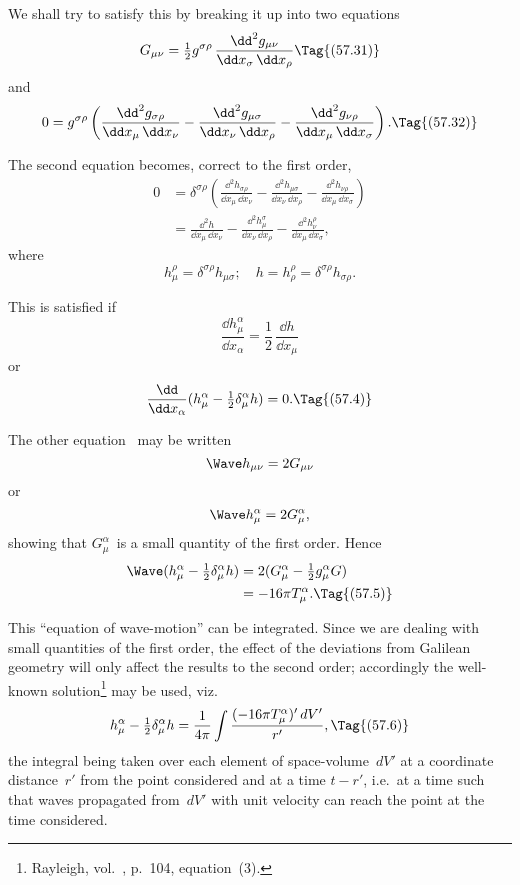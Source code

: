 \documentclass[12pt]{book}
\begin{document}
We shall try to satisfy this by breaking it up into two equations
\[
G_{\mu\nu}
= \tfrac{1}{2}g^{\sigma\rho}\, \frac{\dd^{2} g_{\mu\nu}}{\dd x_{\sigma}\, \dd x_{\rho}}
\Tag{(57.31)}
\]
and
\[
0 = g^{\sigma\rho} \left(\frac{\dd^{2} g_{\sigma\rho}}{\dd x_{\mu}\, \dd x_{\nu}}
  - \frac{\dd^{2} g_{\mu\sigma}}{\dd x_{\nu}\, \dd x_{\rho}}
  - \frac{\dd^{2} g_{\nu\rho}}{\dd x_{\mu}\, \dd x_{\sigma}}\right).
\Tag{(57.32)}
\]

The second equation becomes, correct to the first order,
\begin{align*}
  0 &= \delta^{\sigma\rho} \left(
    \frac{\dd^{2} h_{\sigma\rho}}{\dd x_{\mu}\, \dd x_{\nu}}
  - \frac{\dd^{2} h_{\mu\sigma}}{\dd x_{\nu}\, \dd x_{\rho}}
  - \frac{\dd^{2} h_{\nu\rho}}{\dd x_{\mu}\, \dd x_{\sigma}}\right) \\
  &= \frac{\dd^{2} h}{\dd x_{\mu}\, \dd x_{\nu}}
  - \frac{\dd^{2} h_{\mu}^{\sigma}}{\dd x_{\nu}\, \dd x_{\rho}}
  - \frac{\dd^{2} h_{\nu}^{\rho}}{\dd x_{\mu}\, \dd x_{\sigma}},
\end{align*}
where
\[
h_{\mu}^{\rho} = \delta^{\sigma\rho} h_{\mu\sigma};\quad
h = h_{\rho}^{\rho} = \delta^{\sigma\rho} h_{\sigma\rho}.
\]

This is satisfied if
\[
\frac{\dd h_{\mu}^{\alpha}}{\dd x_{\alpha}}
= \frac{1}{2}\, \frac{\dd h}{\dd x_{\mu}}
\]
or
\[
\frac{\dd}{\dd x_{\alpha}} (h_{\mu}^{\alpha} - \tfrac{1}{2} \delta_{\mu}^{\alpha} h) = 0.
\Tag{(57.4)}
\]

The other equation~ may be written
\[
\Wave h_{\mu\nu} = 2G_{\mu\nu}
\]
or
\[
\Wave h_{\mu}^{\alpha} = 2G_{\mu}^{\alpha},
\]
showing that $G_{\mu}^{\alpha}$~is a small quantity of the first order. Hence
\begin{align*}
  \Wave (h_{\mu}^{\alpha} - \tfrac{1}{2} \delta_{\mu}^{\alpha} h)
  &= 2(G_{\mu}^{\alpha} - \tfrac{1}{2} g_{\mu}^{\alpha} G) \\
  &= -16\pi T_{\mu}^{\alpha}.
  \Tag{(57.5)}
\end{align*}

This ``equation of wave\hyp{}motion'' can be integrated. Since we are dealing
with small quantities of the first order, the effect of the deviations from
Galilean geometry will only affect the results to the second order; accordingly
the well-known solution\footnote
  {Rayleigh,  vol.~, p.~104, equation~(3).}
may be used, viz.\
\[
h_{\mu}^{\alpha} - \tfrac{1}{2} \delta_{\mu}^{\alpha} h
= \frac{1}{4\pi} \int \frac{(-16\pi T_{\mu}^{\alpha})'\, dV'}{r'},
\Tag{(57.6)}
\]
the integral being taken over each element of space\hyp{}volume~$dV'$ at a coordinate
distance~$r'$ from the point considered and at a time $t - r'$, i.e.\ at a time
such that waves propagated from~$dV'$ with unit velocity can reach the point
at the time considered.
\end{document}
